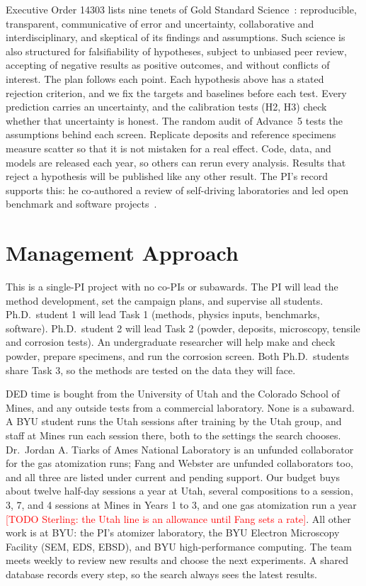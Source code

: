 \documentclass[12pt,letterpaper]{article}
\newcommand{\todo}[1]{\textcolor{red}{[TODO Sterling: #1]}}
\begin{document}
Executive Order 14303 lists nine tenets of Gold Standard
Science~\cite{eo14303}: reproducible, transparent, communicative of error and
uncertainty, collaborative and interdisciplinary, and skeptical of its
findings and assumptions. Such science is also structured for falsifiability
of hypotheses, subject to unbiased peer review, accepting of negative results
as positive outcomes, and without conflicts of interest. The plan follows
each point. Each hypothesis above has a stated rejection
criterion, and we fix the targets and baselines before each test. Every
prediction carries an uncertainty, and the calibration tests (H2, H3) check
whether that uncertainty is honest. The random audit of Advance~5 tests the
assumptions behind each screen. Replicate deposits and
reference specimens measure scatter so that it is not mistaken for a real
effect.
Code, data, and models are released each year, so others can rerun every analysis.
Results that reject a hypothesis will be published like any other result.
The PI's record supports this: he co-authored a review of self-driving laboratories and led open benchmark and software projects~\cite{mptimesplit,baird2024}.

\section{Management Approach}
\label{sec:mgmt}

This is a single-PI project with no co-PIs or subawards. The PI will lead the
method development, set the campaign plans, and supervise all students.
Ph.D.\ student 1 will lead Task 1 (methods, physics inputs, benchmarks,
software). Ph.D.\ student 2 will lead Task 2 (powder, deposits, microscopy,
tensile and corrosion tests). An undergraduate researcher will help make and
check powder, prepare specimens, and run the corrosion screen. Both Ph.D.\
students share Task 3, so the methods are tested on the data they will face.

DED time is bought from the University of Utah and the Colorado School of Mines, and any outside tests from a commercial laboratory.
None is a subaward.
A BYU student runs the Utah sessions after training by the Utah group, and staff at Mines run each session there, both to the settings the search chooses.
Dr.~Jordan A. Tiarks of Ames National Laboratory is an unfunded collaborator for the gas atomization runs; Fang and Webster are unfunded collaborators too, and all three are listed under current and pending support.
Our budget buys about twelve half-day sessions a year at Utah, several compositions to a session, 3, 7, and 4 sessions at Mines in Years 1 to 3, and one gas atomization run a year \todo{the Utah line is an allowance until Fang sets a rate}.
All other work is at BYU: the PI's atomizer laboratory, the BYU Electron Microscopy Facility (SEM, EDS, EBSD), and
BYU high-performance computing. The team meets weekly to review new results and
choose the next experiments. A shared database records every step, so the
search always sees the latest results.
\end{document}

